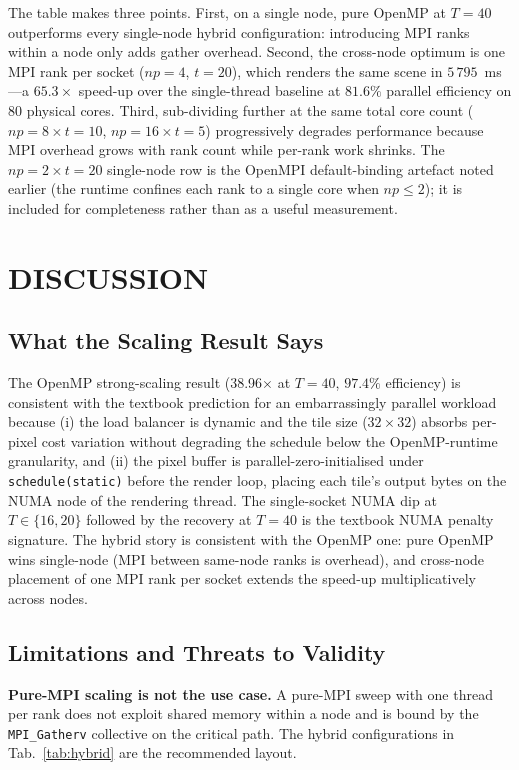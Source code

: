 \documentclass[twocolumn,10pt,cleanhead,cleanfoot]{asme2e}
\begin{document}
The table makes three points. First, on a single node, pure OpenMP at $T=40$ outperforms every single-node hybrid configuration: introducing MPI ranks within a node only adds gather overhead. Second, the cross-node optimum is one MPI rank per socket ($np=4$, $t=20$), which renders the same scene in $5\,795$~ms---a $65.3\times$ speed-up over the single-thread baseline at $81.6\%$ parallel efficiency on $80$ physical cores. Third, sub-dividing further at the same total core count ($np=8\!\times\!t=10$, $np=16\!\times\!t=5$) progressively degrades performance because MPI overhead grows with rank count while per-rank work shrinks. The $np=2 \times t=20$ single-node row is the OpenMPI default-binding artefact noted earlier (the runtime confines each rank to a single core when $np \leq 2$); it is included for completeness rather than as a useful measurement.

\section*{DISCUSSION}

\subsection*{What the Scaling Result Says}
The OpenMP strong-scaling result (38.96$\times$ at $T=40$, $97.4\%$ efficiency) is consistent with the textbook prediction for an embarrassingly parallel workload because (i) the load balancer is dynamic and the tile size ($32\!\times\!32$) absorbs per-pixel cost variation without degrading the schedule below the OpenMP-runtime granularity, and (ii) the pixel buffer is parallel-zero-initialised under \texttt{schedule(static)} before the render loop, placing each tile's output bytes on the NUMA node of the rendering thread. The single-socket NUMA dip at $T\in\{16,20\}$ followed by the recovery at $T=40$ is the textbook NUMA penalty signature. The hybrid story is consistent with the OpenMP one: pure OpenMP wins single-node (MPI between same-node ranks is overhead), and cross-node placement of one MPI rank per socket extends the speed-up multiplicatively across nodes.

\subsection*{Limitations and Threats to Validity}
\textbf{Pure-MPI scaling is not the use case.} A pure-MPI sweep with one thread per rank does not exploit shared memory within a node and is bound by the \texttt{MPI\_Gatherv} collective on the critical path. The hybrid configurations in Tab.~\ref{tab:hybrid} are the recommended layout.
\end{document}
